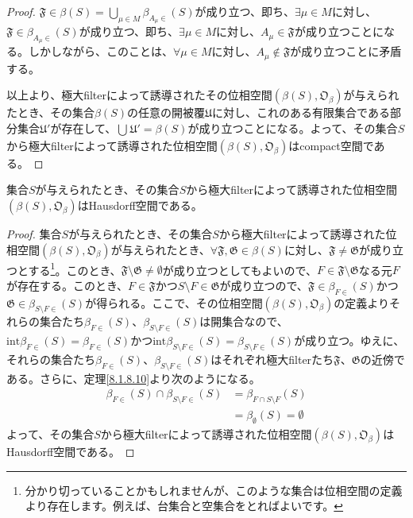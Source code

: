 \documentclass[dvipdfmx]{jsarticle}
\begin{document}
\begin{proof}
$\mathfrak{F}\in \beta(S) = \bigcup_{\mu \in M} {\beta_{A_{\mu} \in}(S)}$が成り立つ、即ち、$\exists\mu \in M$に対し、$\mathfrak{F}\in \beta_{A_{\mu} \in}(S)$が成り立つ、即ち、$\exists\mu \in M$に対し、$A_{\mu}\in \mathfrak{F}$が成り立つことになる。しかしながら、このことは、$\forall\mu \in M$に対し、$A_{\mu}\notin \mathfrak{F}$が成り立つことに矛盾する。\par
以上より、極大filterによって誘導されたその位相空間$\left( \beta(S),\mathfrak{O}_{\beta} \right)$が与えられたとき、その集合$\beta(S)$の任意の開被覆$\mathfrak{U}$に対し、これのある有限集合である部分集合$\mathfrak{U}'$が存在して、$\bigcup_{} \mathfrak{U}' = \beta(S)$が成り立つことになる。よって、その集合$S$から極大filterによって誘導された位相空間$\left( \beta(S),\mathfrak{O}_{\beta} \right)$はcompact空間である。
\end{proof}
\begin{thm}\label{8.1.8.13}
集合$S$が与えられたとき、その集合$S$から極大filterによって誘導された位相空間$\left( \beta(S),\mathfrak{O}_{\beta} \right)$はHausdorff空間である。
\end{thm}
\begin{proof}
集合$S$が与えられたとき、その集合$S$から極大filterによって誘導された位相空間$\left( \beta(S),\mathfrak{O}_{\beta} \right)$が与えられたとき、$\mathfrak{\forall F,G \in}\beta(S)$に対し、$\mathfrak{F \neq G}$が成り立つとする\footnote{分かり切っていることかもしれませんが、このような集合は位相空間の定義より存在します。例えば、台集合と空集合をとればよいです。}。このとき、$\mathfrak{F \setminus G \neq \emptyset}$が成り立つとしてもよいので、$F \in \mathfrak{F \setminus G}$なる元$F$が存在する。このとき、$F \in \mathfrak{F}$かつ$S \setminus F \in \mathfrak{G}$が成り立つので、$\mathfrak{F}\in \beta_{F \in}(S)$かつ$\mathfrak{G \in}\beta_{S \setminus F \in}(S)$が得られる。ここで、その位相空間$\left( \beta(S),\mathfrak{O}_{\beta} \right)$の定義よりそれらの集合たち$\beta_{F \in}(S)$、$\beta_{S \setminus F \in}(S)$は開集合なので、${\mathrm{int}}{\beta_{F \in}(S)} = \beta_{F \in}(S)$かつ${\mathrm{int}}{\beta_{S \setminus F \in}(S)} = \beta_{S \setminus F \in}(S)$が成り立つ。ゆえに、それらの集合たち$\beta_{F \in}(S)$、$\beta_{S \setminus F \in}(S)$はそれぞれ極大filterたち$\mathfrak{F}$、$\mathfrak{G}$の近傍である。さらに、定理\ref{8.1.8.10}より次のようになる。
\begin{align*}
\beta_{F \in}(S) \cap \beta_{S \setminus F \in}(S) &= \beta_{F \cap S \setminus F}(S)\\
&= \beta_{\emptyset}(S) = \emptyset
\end{align*}
よって、その集合$S$から極大filterによって誘導された位相空間$\left( \beta(S),\mathfrak{O}_{\beta} \right)$はHausdorff空間である。
\end{proof}
\end{document}
